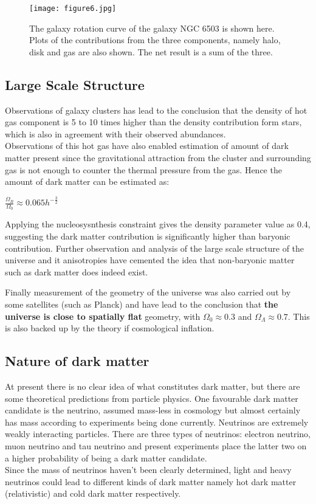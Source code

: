 \begin{figure}[H]
    \centering
    \texttt{[image: figure6.jpg]}
    \caption{The galaxy rotation curve of the galaxy NGC 6503 is shown here. Plots of the contributions from the three components, namely halo, disk and gas are also shown. The net result is a sum of the three.}
    \label{fig:curvesrotation}
\end{figure}

\subsection{Large Scale Structure}
Observations of galaxy clusters has lead to the conclusion that the density of hot gas component is 5 to 10 times higher than the density contribution form stars, which is also in agreement with their observed abundances.
\\
Observations of this hot gas have also enabled estimation of amount of dark matter present since the gravitational attraction from the cluster and surrounding gas is not enough to counter the thermal pressure from the gas. Hence the amount of dark matter can be estimated as:

\begin{center}
   $\frac{\Omega_B}{\Omega_0} \approx 0.065 h^{-\frac{3}{2}}$
\end{center}

Applying the nucleosysnthesis constraint gives the density parameter value as 0.4, suggesting the dark matter contribution is significantly higher than baryonic contribution. Further observation and analysis of the large scale structure of the universe and it anisotropies have cemented the idea that non-baryonic matter such as dark matter does indeed exist.

Finally measurement of the geometry of the universe was also carried out by some satellites (such as Planck) and have lead to the conclusion that \textbf{the universe is close to spatially flat} geometry, with $\Omega_0 \approx 0.3$ and $\Omega_{\Lambda} \approx 0.7$. This is also backed up by the theory if cosmological inflation.

\subsection{Nature of dark matter}
At present there is no clear idea of what constitutes dark matter, but there are some theoretical predictions from particle physics. One favourable dark matter candidate is the neutrino, assumed mass-less in cosmology but almost certainly has mass according to experiments being done currently. Neutrinos are extremely weakly interacting particles. There are three types of neutrinos: electron neutrino, muon neutrino and tau neutrino and present experiments place the latter two on a higher probability of being a dark matter candidate.
\\
Since the mass of neutrinos haven't been clearly determined, light and heavy neutrinos could lead to different kinds of dark matter namely hot dark matter (relativistic) and cold dark matter respectively.

